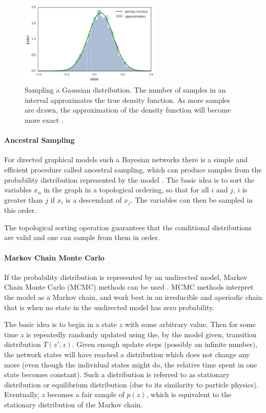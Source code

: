 \begin{figure}
	\centering
    	\includegraphics[width=0.6\textwidth]{imgs/sampling.png} 
    \caption[Sampling a Gaussian distribution.]{Sampling a Gaussian distribution. The number of samples in an interval approximates the true density function. As more samples are drawn, the approximation of the density function will become more exact \cite{sampleFD}.}
	\label{fig:Sampling}
\end{figure}



\paragraph{Ancestral Sampling} For directed graphical models such a Bayesian networks there is a simple and efficient procedure called ancestral sampling, which can produce samples from the probability distribution represented by the model \cite{Goodfellow-et-al-2016-Book}. 
The basic idea is to sort the variables $x_n$ in the graph in a topological ordering, so that for all $i$ and $j$, $i$ is greater than $j$ if $x_i$ is a descendant of $x_j$. The variables can then be sampled in this order.

The topological sorting operation guarantees that the conditional distributions are valid and one can sample from them in order.

\paragraph{Markov Chain Monte Carlo} If the probability distribution is represented by an undirected model, Markov Chain Monte Carlo (MCMC) methods can be used \cite{Goodfellow-et-al-2016-Book}. 
MCMC methods interpret the model as a Markov chain, and work best in an irreducible and aperiodic chain that is when no state in the undirected model has zero probability.

The basic idea is to begin in a state $z$ with some arbitrary value. 
Then for some time $z$ is repeatedly randomly updated using the, by the model given, transition distribution $T(z',z)$. 
Given enough update steps (possibly an infinite number), the network states will have reached a distribution which does not change any more (even though the individual states might do, the relative time spent in one state becomes constant).
Such a distribution is referred to as stationary distribution or equilibrium distribution (due to its similarity to particle physics).
Eventually, $z$ becomes a fair sample of $p(z)$, which is equivalent to the stationary distribution of the Markov chain.


